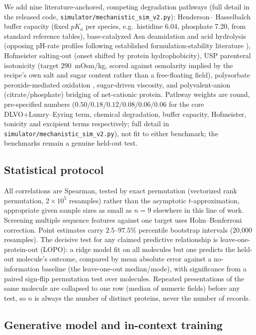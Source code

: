 \documentclass[twocolumn,10pt]{article}
\begin{document}
We add nine literature-anchored, competing degradation pathways (full detail in
the released code, \texttt{simulator/mechanistic\_sim\_v2.py}): Henderson--
Hasselbalch buffer capacity (fixed $pK_a$ per species, e.g.\ histidine 6.04,
phosphate 7.20, from standard reference tables), base-catalyzed Asn deamidation
and acid hydrolysis (opposing pH-rate profiles following established
formulation-stability literature \cite{manning2010,wakankar2006}), Hofmeister
salting-out (onset shifted by protein hydrophobicity), USP parenteral
isotonicity (target $290$~mOsm/kg, scored against osmolarity implied by the
recipe's own salt and sugar content rather than a free-floating field),
polysorbate peroxide-mediated oxidation \cite{kishore2011}, sugar-driven
viscosity, and polyvalent-anion (citrate/phosphate) bridging of net-cationic
protein. Pathway weights are round, pre-specified numbers ($0.50/0.18/0.12/0.08/
0.06/0.06$ for the core DLVO+Lumry--Eyring term, chemical degradation, buffer
capacity, Hofmeister, tonicity and excipient terms respectively; full detail in
\texttt{simulator/mechanistic\_sim\_v2.py}), not fit to either benchmark; the
benchmarks remain a genuine held-out test.

\subsection{Statistical protocol}
\label{sec:stats}

All correlations are Spearman, tested by exact permutation (vectorized rank
permutation, $2\times10^5$ resamples) rather than the asymptotic $t$-approximation,
appropriate given sample sizes as small as $n=9$ elsewhere in this line of work.
Screening multiple sequence features against one target uses Holm--Bonferroni
correction. Point estimates carry $2.5$--$97.5\%$ percentile bootstrap intervals
(20{,}000 resamples). The decisive test for any claimed predictive relationship is
leave-one-protein-out (LOPO): a ridge model fit on all molecules but one predicts
the held-out molecule's outcome, compared by mean absolute error against a
no-information baseline (the leave-one-out median/mode), with significance from a
paired sign-flip permutation test over molecules. Repeated presentations of the
same molecule are collapsed to one row (median of numeric fields) before any test,
so $n$ is always the number of distinct proteins, never the number of records.

\subsection{Generative model and in-context training}
\label{sec:model}
\end{document}
